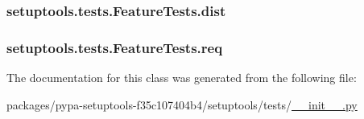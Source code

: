 \subsubsection[{dist}]{\setlength{\rightskip}{0pt plus 5cm}setuptools.\+tests.\+Feature\+Tests.\+dist}\label{classsetuptools_1_1tests_1_1FeatureTests_a20a7ddfeb08daf82a62aea8863255171}
\hypertarget{classsetuptools_1_1tests_1_1FeatureTests_a21a421e46f1bf5ffd49765c7d47ca3ee}{}
\subsubsection[{req}]{\setlength{\rightskip}{0pt plus 5cm}setuptools.\+tests.\+Feature\+Tests.\+req}\label{classsetuptools_1_1tests_1_1FeatureTests_a21a421e46f1bf5ffd49765c7d47ca3ee}


The documentation for this class was generated from the following file\+:\begin{DoxyCompactItemize}
\item 
packages/pypa-\/setuptools-\/f35c107404b4/setuptools/tests/\hyperlink{packages_2pypa-setuptools-f35c107404b4_2setuptools_2tests_2____init_____8py}{\+\_\+\+\_\+init\+\_\+\+\_\+.\+py}\end{DoxyCompactItemize}
